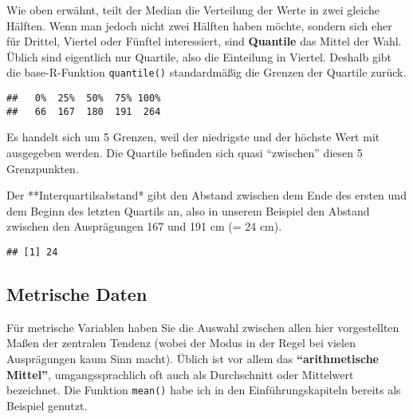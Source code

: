 \documentclass[
]{book}
\newenvironment{Shaded}{\begin{snugshade}}{\end{snugshade}}
\newcommand{\AttributeTok}[1]{\textcolor[rgb]{0.77,0.63,0.00}{#1}}
\newcommand{\ConstantTok}[1]{\textcolor[rgb]{0.00,0.00,0.00}{#1}}
\newcommand{\FunctionTok}[1]{\textcolor[rgb]{0.00,0.00,0.00}{#1}}
\newcommand{\NormalTok}[1]{#1}
\newcommand{\SpecialCharTok}[1]{\textcolor[rgb]{0.00,0.00,0.00}{#1}}
\begin{document}
Wie oben erwähnt, teilt der Median die Verteilung der Werte in zwei gleiche Hälften. Wenn man jedoch nicht zwei Hälften haben möchte, sondern sich eher für Drittel, Viertel oder Fünftel interessiert, sind \textbf{Quantile} das Mittel der Wahl. Üblich sind eigentlich nur Quartile, also die Einteilung in Viertel. Deshalb gibt die base-R-Funktion \texttt{quantile()} standardmäßig die Grenzen der Quartile zurück.

\begin{Shaded}
\end{Shaded}

\begin{verbatim}
##   0%  25%  50%  75% 100% 
##   66  167  180  191  264
\end{verbatim}

Es handelt sich um 5 Grenzen, weil der niedrigste und der höchste Wert mit ausgegeben werden. Die Quartile befinden sich quasi ``zwischen'' diesen 5 Grenzpunkten.

Der **Interquartilsabstand* gibt den Abstand zwischen dem Ende des ersten und dem Beginn des letzten Quartils an, also in unserem Beispiel den Abstand zwischen den Ausprägungen 167 und 191 cm (= 24 cm).

\begin{Shaded}
\end{Shaded}

\begin{verbatim}
## [1] 24
\end{verbatim}

\hypertarget{metrische-daten}{%
\subsection{Metrische Daten}\label{metrische-daten}}

Für metrische Variablen haben Sie die Auswahl zwischen allen hier vorgestellten Maßen der zentralen Tendenz (wobei der Modus in der Regel bei vielen Ausprägungen kaum Sinn macht). Üblich ist vor allem das \textbf{``arithmetische Mittel''}, umgangssprachlich oft auch als Durchschnitt oder Mittelwert bezeichnet. Die Funktion \texttt{mean()} habe ich in den Einführungskapiteln bereits als Beispiel genutzt.
\end{document}
